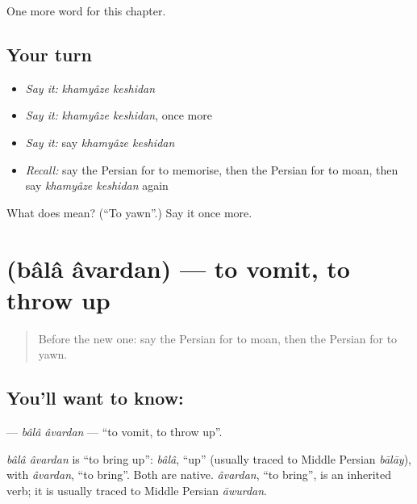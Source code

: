 \begin{grammarlens}[title={What you've built}]
One more word for this chapter.
\end{grammarlens}

\subsection*{Your turn}
\begin{itemize}
\raggedright
  \item \emph{Say it:} \emph{khamyâze keshidan}
  \item \emph{Say it:} \emph{khamyâze keshidan}, once more
  \item \emph{Say it:} say \emph{khamyâze keshidan}
  \item \emph{Recall:} say the Persian for to memorise, then the Persian for to moan, then say \emph{khamyâze keshidan} again
\end{itemize}

\begin{tcolorbox}[breakable,colback=teal!4,colframe=teal!35!black,title={Before you move on}]
What does   mean? (\textquotedblleft{}To yawn\textquotedblright{}.) Say it once more.
\end{tcolorbox}
\section[\texorpdfstring{\fa{بالا} \fa{آوردن} (bâlâ âvardan)}{بالا آوردن (bâlâ âvardan)}]{  (bâlâ âvardan) — to vomit, to throw up}

\label{lesson:FA-C225-bala-avardan}



\begin{quote}
Before the new one: say the Persian for to moan, then the Persian for to yawn.
\end{quote}

\subsection*{You'll want to know:  }
\textbf{ } — \emph{bâlâ âvardan} — \textquotedblleft{}to vomit, to throw up\textquotedblright{}.

\begin{cousinweb}
\emph{bâlâ âvardan} is \textquotedblleft{}to bring up\textquotedblright{}: \emph{bâlâ}, \textquotedblleft{}up\textquotedblright{} (usually traced to Middle Persian \emph{bālāy}), with \emph{âvardan}, \textquotedblleft{}to bring\textquotedblright{}. Both are native. \emph{âvardan}, \textquotedblleft{}to bring\textquotedblright{}, is an inherited verb; it is usually traced to Middle Persian \emph{āwurdan}.
\end{cousinweb}

